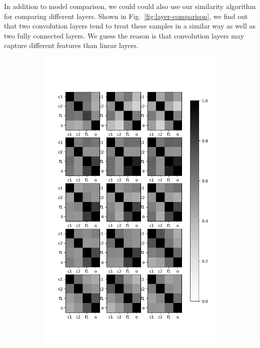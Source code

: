 \documentclass[11pt, twocolumn]{article}
\begin{document}
In addition to model comparison, we could could also use our similarity algorithm for comparing different layers. Shown in Fig.~\ref{fig:layer-comparison},  we find out that two convolution layers tend to treat these samples in a similar way as well
as two fully connected layers. We guess the reason is that convolution layers may capture different features than linear layers.


\begin{figure}
	\centering
	\begin{subfigure}[b]{0.3\textwidth}
		\centering
		\includegraphics[width=\textwidth]{figs/nn1_sim.png}

\end{subfigure}
\end{figure}
\end{document}

